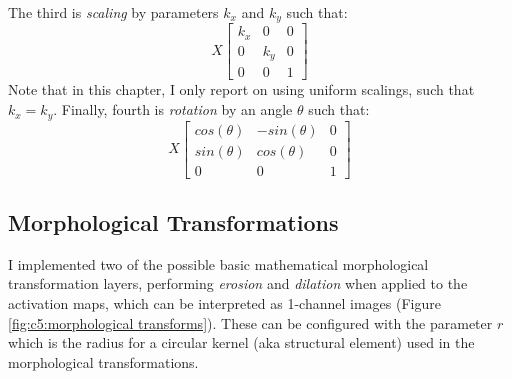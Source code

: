 \noindent The third is \emph{scaling} by parameters $k_x$ and $k_y$ such that:
\begin{equation}
X \begin{bmatrix}
k_x & 0 & 0\\
0 & k_y & 0\\
0 & 0 & 1
\end{bmatrix}
\end{equation}
Note that in this chapter, I only report on using uniform scalings, such that $k_x = k_y$. Finally, fourth is \emph{rotation} by an angle $\theta$ such that:
\begin{equation}
X \begin{bmatrix}
cos(\theta) & -sin(\theta) & 0\\
sin(\theta) & cos(\theta) & 0\\
0 & 0 & 1
\end{bmatrix}
\end{equation}

\subsection{Morphological Transformations}

I implemented two of the possible basic mathematical morphological transformation layers, performing \emph{erosion} and \emph{dilation} \citep{soille1999erosion} when applied to the activation maps, which can be interpreted as 1-channel images (Figure \ref{fig:c5:morphological transforms}). 
These can be configured with the parameter $r$ which is the radius for a circular kernel (aka structural element) used in the morphological transformations.

